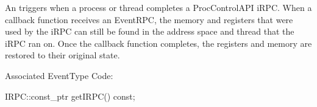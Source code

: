 
An  triggers when a process or thread completes a ProcControlAPI
iRPC. When a callback function receives an EventRPC, the memory and registers
that were used by the iRPC can still be found in the address space and thread
that the iRPC ran on. Once the callback function completes, the registers and
memory are restored to their original state.

Associated EventType Code: 

\begin{apient}
IRPC::const_ptr getIRPC() const;
\end{apient}

